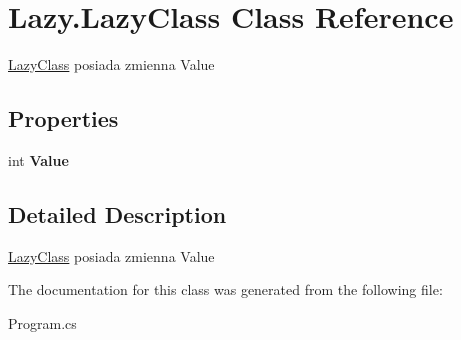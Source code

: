 \hypertarget{class_lazy_1_1_lazy_class}{}\section{Lazy.\+Lazy\+Class Class Reference}
\label{class_lazy_1_1_lazy_class}


\hyperlink{class_lazy_1_1_lazy_class}{Lazy\+Class} posiada zmienna Value  


\subsection*{Properties}
\begin{DoxyCompactItemize}
\item 
\mbox{\label{class_lazy_1_1_lazy_class_a2a1456d409b792a8b531c05f216cba4f}} 
int {\bfseries Value}
\end{DoxyCompactItemize}


\subsection{Detailed Description}
\hyperlink{class_lazy_1_1_lazy_class}{Lazy\+Class} posiada zmienna Value 



The documentation for this class was generated from the following file\+:\begin{DoxyCompactItemize}
\item 
Program.\+cs\end{DoxyCompactItemize}
